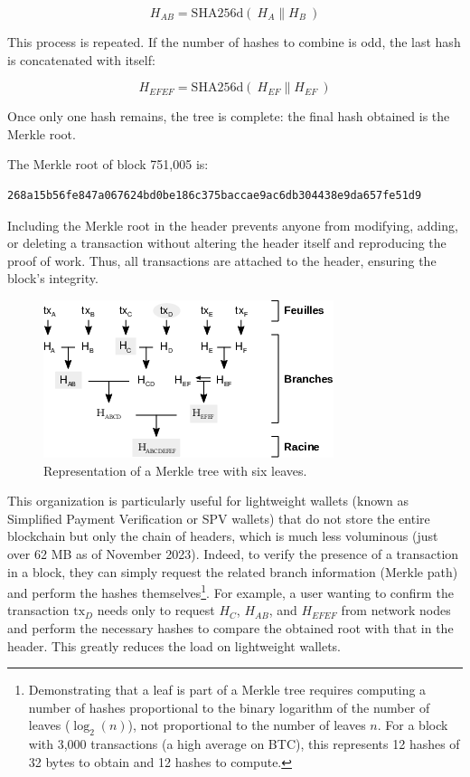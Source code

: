 \documentclass[
  a5paper,
  smalldemyvopaper,10pt,twoside,onecolumn,openright,extrafontsizes,hidelinks]{memoir}
\begin{document}
\[H_{A\!B} = \mathrm{SHA256d}(~H_A \parallel H_B~)\]

This process is repeated. If the number of hashes to combine is odd, the
last hash is concatenated with itself:

\[H_{E\!F\!E\!F} = \mathrm{SHA256d}(~H_{E\!F} \parallel H_{E\!F}~)\]

Once only one hash remains, the tree is complete: the final hash
obtained is the Merkle root.

The Merkle root of block 751,005 is:

\begin{verbatim}
268a15b56fe847a067624bd0be186c375baccae9ac6db304438e9da657fe51d9
\end{verbatim}

Including the Merkle root in the header prevents anyone from modifying,
adding, or deleting a transaction without altering the header itself and
reproducing the proof of work. Thus, all transactions are attached to
the header, ensuring the block's integrity.

\begin{figure}

{\centering \includegraphics{chapters/img/merkle-tree.png}

}

\caption{Representation of a Merkle tree with six leaves.}

\end{figure}%

This organization is particularly useful for lightweight wallets (known
as Simplified Payment Verification or SPV wallets) that do not store the
entire blockchain but only the chain of headers, which is much less
voluminous (just over 62 MB as of November 2023). Indeed, to verify the
presence of a transaction in a block, they can simply request the
related branch information (Merkle path) and perform the hashes
themselves\footnote{Demonstrating that a leaf is part of a Merkle tree
  requires computing a number of hashes proportional to the binary
  logarithm of the number of leaves (\(\log_{2}(n)\)), not proportional
  to the number of leaves \(n\). For a block with 3,000 transactions (a
  high average on BTC), this represents 12 hashes of 32 bytes to obtain
  and 12 hashes to compute.}. For example, a user wanting to confirm the
transaction \(\mathrm{tx}_D\) needs only to request \(H_C\),
\(H_{A\!B}\), and \(H_{E\!F\!E\!F}\) from network nodes and perform the
necessary hashes to compare the obtained root with that in the header.
This greatly reduces the load on lightweight wallets.
\end{document}
